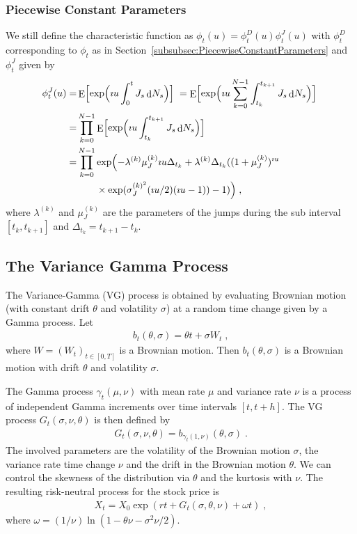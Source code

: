 \documentclass[10pt,a4paper]{article}
\numberwithin{equation}{section} %
\theoremstyle{plain}
\theoremstyle{definition}
\theoremstyle{remark}
\providecommand{\subsubsecref}[1]{Section~\ref{#1}}
\def\D{\dif\!}
\def\tT{\ensuremath{{t\in\left[0,T\right]}}}
\DeclareMathOperator{\dif}{d}
\DeclareMathOperator{\Ex}{E}
\begin{document}
\subsubsection{Piecewise Constant Parameters}
\label{subsubsec:PiecewiseConstantParametersBates}

We still define the characteristic function as $\phi_t(u)=\phi_t^D(u)\phi_t^J(u)$ with $\phi_t^D$ corresponding to  $\phi_t$ as in \subsubsecref{subsubsec:PiecewiseConstantParameters} and $\phi_t^J$ given by
\begin{align*}
\phi_t^J(u)=&\Ex\Bigl[\exp\Bigl(\imath u\int_0^t{J_s}\D N_s\Bigr)\Bigr]\;
=\Ex\Bigl[\exp\Bigl(\imath u\sum_{k=0}^{N-1}\int_{t_k}^{t_{k+1}}{J_s}\D N_s\Bigr)\Bigr]\;\\
=&\prod_{k=0}^{N-1}{\Ex\Bigl[\exp\Bigl(\imath u\int_{t_k}^{t_{k+1}}{J_s}\D N_s\Bigr)\Bigr]} \;\\
=&\prod_{k=0}^{N-1}\exp\Bigl(-\lambda^{(k)}\mu_J^{(k)}\imath u\Delta_{t_k}+\lambda^{(k)} \Delta_{t_k}((1+\mu_J^{(k)})^{\imath u} \\
& \qquad \times \exp(\sigma_J^{(k)^2}(\imath u/2)(\imath u-1))-1)\Bigr)\;,
\end{align*}
where $\lambda^{(k)}$ and $\mu_J^{(k)}$ are the parameters of the jumps during the sub interval $[t_k,t_{k+1}]$ and $\Delta_{t_k}=t_{k+1}-t_k$.

\subsection{The Variance Gamma Process}
\label{subsec:VGProcess}

The Variance-Gamma (VG) process is obtained by evaluating Brownian motion (with constant drift $\theta$ and volatility $\sigma$) at a random time change given by a Gamma process. Let
\begin{align*}
b_t(\theta,\sigma)=\theta t+\sigma W_t\;,
\end{align*}
where $W=(W_t)_{\tT}$ is a Brownian motion. Then $b_t( \theta, \sigma)$ is a Brownian motion with drift $\theta$ and volatility $\sigma$.

The Gamma process $\gamma_t(\mu,\nu)$ with mean rate $\mu$ and variance rate $\nu$ is a process of independent Gamma increments over time intervals $[t,t+h]$. The VG process $G_t(\sigma, \nu, \theta)$ is then defined by
\begin{align*}
G_t(\sigma,\nu,\theta)=b_{\gamma_t( 1, \nu)}(\theta, \sigma)\;.
\end{align*}
The involved parameters are the volatility of the Brownian motion $\sigma$, the variance rate time change $\nu$ and the drift in the Brownian motion $\theta$. We can control the skewness of the distribution via $\theta$ and the kurtosis with $\nu$. The resulting risk-neutral process for the stock price is
\begin{align*}
X_t=X_0\exp(rt+G_t(\sigma,\theta,\nu)+\omega t)\;,
\end{align*}
where $\omega=(1/\nu)\ln(1-\theta\nu-\sigma^2\nu/2)$.
\end{document}
